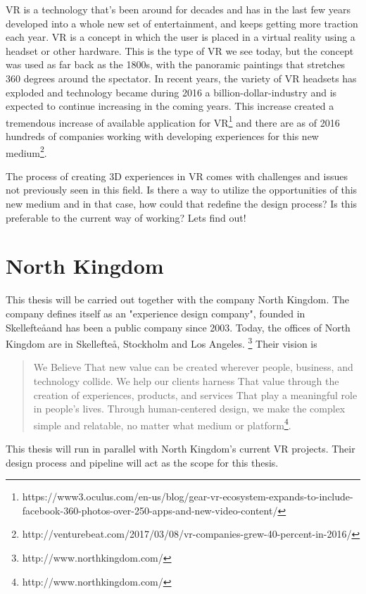 VR is a technology that's been around for decades and has in the last few years developed into a whole new set of entertainment, and keeps getting more traction each year\cite{VR:mazuryk1996virtual}. VR is a concept in which the user is placed in a virtual reality using a headset or other hardware. This is the type of VR we see today, but the concept was used  as far back as the 1800s, with the panoramic paintings that stretches 360 degrees around the spectator. In recent years, the variety of VR headsets has exploded and technology became during 2016 a billion-dollar-industry and is expected to continue increasing in the coming years\cite{VR_stats:statista}.
This increase created a tremendous increase of available application for VR\footnote{https://www3.oculus.com/en-us/blog/gear-vr-ecosystem-expands-to-include-facebook-360-photos-over-250-apps-and-new-video-content/} and there are as of 2016 hundreds of companies working with developing experiences for this new medium\footnote{http://venturebeat.com/2017/03/08/vr-companies-grew-40-percent-in-2016/}.

The process of creating 3D experiences in VR comes with challenges and issues not previously seen in this field. Is there a way to utilize the opportunities of this new medium and in that case, how could that redefine the design process? Is this preferable to the current way of working? Lets find out!

\section{North Kingdom}
This thesis will be carried out together with the company North Kingdom. The company defines itself as an "experience design company", founded in Skellefte\aa and has been a public company since 2003. Today, the offices of North Kingdom are in Skellefte\aa, Stockholm and Los Angeles. \footnote{http://www.northkingdom.com/} Their vision is
\begin{quote}
We Believe That new value can be created wherever people, business, and technology collide. We help our clients harness That value through the creation of experiences, products, and services That play a meaningful role in people's lives. Through human-centered design, we make the complex simple and relatable, no matter what medium or platform\footnote{http://www.northkingdom.com/}.
\end{quote}
This thesis will run in parallel with North Kingdom's current VR projects. Their design process and pipeline will act as the scope for this thesis.

